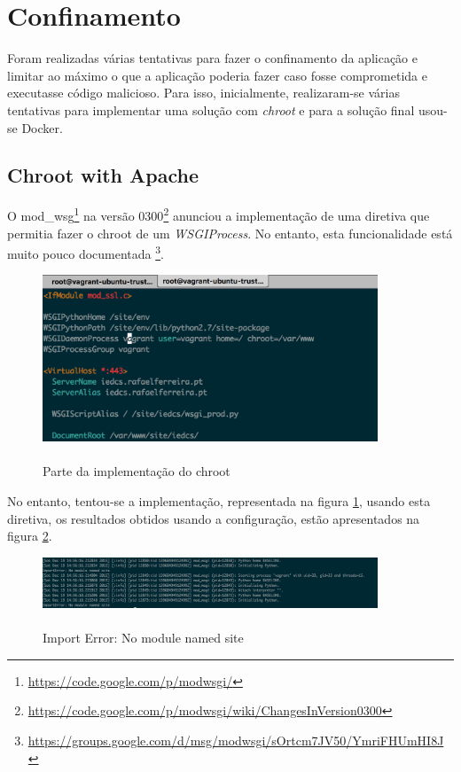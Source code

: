\documentclass[pdftex,12pt,a4paper]{report}
\begin{document}
\section{Confinamento}
Foram realizadas várias tentativas para fazer o confinamento da aplicação e limitar ao máximo o que a aplicação poderia fazer caso fosse comprometida e executasse código malicioso. Para isso, inicialmente, realizaram-se várias tentativas para implementar uma solução com \textit{chroot} e para a solução final usou-se Docker.

\subsection{Chroot with Apache}
O mod\_wsg\footnote{\label{url1} \url{https://code.google.com/p/modwsgi/}} na versão 0300\footnote{\label{url1} \url{https://code.google.com/p/modwsgi/wiki/ChangesInVersion0300}} anunciou a implementação de uma diretiva que permitia fazer o chroot de um \textit{WSGIProcess}. No entanto, esta funcionalidade está muito pouco documentada \footnote{\label{url1} \url{https://groups.google.com/d/msg/modwsgi/sOrtcm7JV50/YmriFHUmHI8J}}.

\begin{figure}[!htb]
\center
 \includegraphics[width=100mm,scale=1]{apache_chroot_config.png}
 \caption{\\Parte da implementação do chroot}
 \label{fig:apache_chroot_config}
\end{figure}

No entanto, tentou-se a implementação, representada na figura \ref{fig:apache_chroot_config}, usando esta diretiva, os resultados obtidos usando a configuração, estão apresentados na figura \ref{fig:import_Error}.

\begin{figure}[!htb]
\center
 \includegraphics[width=100mm,scale=1]{import_error.png}
 \caption{\\Import Error: No module named site}
 \label{fig:import_Error}
\end{figure}
\end{document}
